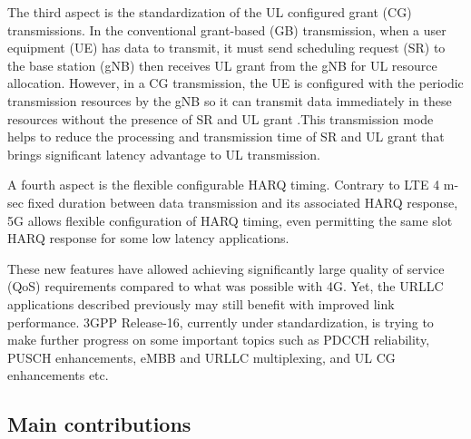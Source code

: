 \documentclass{ieeeaccess}
\begin{document}
The third aspect is the standardization of the UL configured grant (CG) transmissions. In the conventional grant-based (GB) transmission, when a user equipment (UE) has data to transmit, it must send scheduling request (SR) to the base station (gNB) then receives UL grant from the gNB for UL resource allocation. However, in a CG transmission, the UE is configured with the periodic transmission resources by the gNB so it can transmit data immediately in these resources without the presence of SR and UL grant \cite{ref5}.This transmission mode helps to reduce the processing and transmission time of SR and UL grant that brings significant latency advantage to UL transmission.

A fourth aspect is the flexible configurable HARQ timing. Contrary to LTE 4 m-sec fixed duration between data transmission and its associated HARQ response, 5G allows flexible configuration of HARQ timing, even permitting the same slot HARQ response for some low latency applications.

These new features have allowed achieving significantly large quality of service (QoS) requirements compared to what was possible with 4G. Yet, the URLLC applications described previously may still benefit with improved link performance. 3GPP Release-16, currently under standardization, is trying to make further progress on some important topics such as PDCCH reliability, PUSCH enhancements, eMBB and URLLC multiplexing, and UL CG enhancements etc. 

\subsection{Main contributions}
\end{document}
